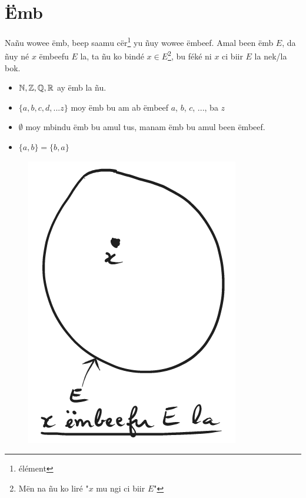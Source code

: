 \documentclass[twoside, a4paper]{article}
\begin{document}
 



\section{Ëmb}
\begin{tcolorbox}[enhanced jigsaw,breakable,pad at break*=1mm,
    colback=red!5!white,colframe=white!75!black,title= Téeki,
    watermark color=white]
  Nañu wowee ëmb, beep saamu cër\footnote{élément} yu ñuy wowee ëmbeef. Amal been ëmb $E$, da ñuy né $x$ ëmbeefu $E$ la, ta ñu ko bindé $x\in E$\footnote{Mën na ñu ko liré "$x$ mu ngi ci biir $E$"}, bu féké ni $x$ ci biir $E$ la nek/la bok.
\end{tcolorbox}

\begin{itemize}
    \item $\mathbb{N}, \mathbb{Z}, \mathbb{Q}, \mathbb{R}$ ay ëmb la ñu.
    \item $\{a, b, c, d, ... z\}$ moy ëmb bu am ab ëmbeef $a$, $b$, $c$, ..., ba $z$
    \item $\emptyset$ moy mbindu ëmb bu amul tus, manam ëmb bu amul been ëmbeef.
    \item $\{a, b\} = \{b, a\}$
\end{itemize}

\begin{figure}[h]
    \centering
    \includegraphics[scale = 0.5]{image/embeefu_emb.png}
    \label{fig:my_label}
\end{figure}
\end{document}
